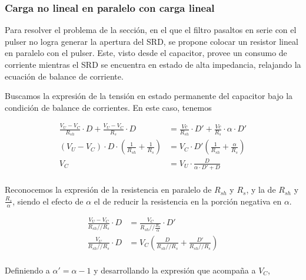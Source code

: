 \subsubsection{Carga no lineal en paralelo con carga lineal}

Para resolver el problema de la sección, en el que el filtro pasaltos en serie
con el pulser no logra generar la apertura del SRD, se propone colocar un
resistor lineal en paralelo con el pulser. Este, visto desde el capacitor,
provee un consumo de corriente mientras el SRD se encuentra en estado de alta
impedancia, relajando la ecuación de balance de corriente.

Buscamos la expresión de la tensión en estado permanente del capacitor bajo la
condición de balance de corrientes. En este caso, tenemos

\begin{equation}
    \label{eq:vc_non_linear_load_with_shunt_0}
    \begin{aligned}
        \frac{V_U-V_C}{R_{sh}} \cdot D + \frac{V_U-V_C}{R_{s}} \cdot D &=
        \frac{Vc}{R_{sh}} \cdot D' + \frac{Vc}{R_{s}} \cdot \alpha \cdot D' \\
        \left( V_U - V_C \right) \cdot D \cdot \left( \frac{1}{R_{sh}} +
        \frac{1}{R_s} \right) &= V_C \cdot D' \left( \frac{1}{R_{sh}} +
        \frac{\alpha}{R_s} \right) \\
        V_C &= V_U \cdot \frac{D}{\alpha \cdot D' + D}  \\
    \end{aligned}
\end{equation}

Reconocemos la expresión de la resistencia en paralelo de $R_{sh}$ y $R_s$, y la
de $R_{sh}$ y $\frac{R_s}{\alpha}$, siendo el efecto de $\alpha$ el de reducir
la resistencia en la porción negativa en $\alpha$.

\begin{equation}
    \label{eq:vc_non_linear_load_with_shunt_1}
    \begin{aligned}
        \frac{V_U-V_C}{R_{sh} // R_{s}} \cdot D &= \frac{V_C}{R_{sh} //
        \frac{R_{s}}{\alpha}} \cdot D'  \\
        \frac{V_U}{R_{sh} // R_{s}} \cdot D &= V_C \left( \frac{D}{R_{sh}
        // R_{s}} + \frac{D'}{R_{sh} // R_{s}} \right) \\
    \end{aligned}
\end{equation}

Definiendo a $\alpha'=\alpha-1$ y desarrollando la expresión que acompaña a $V_C$,

